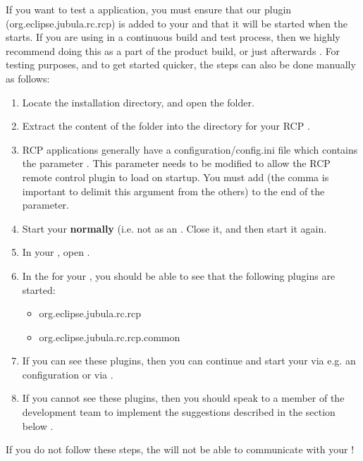 
If you want to test a  application, you must ensure that our  plugin (org.eclipse.jubula.rc.rcp) is added to your \gdaut{} and that it will be started when the \gdaut{} starts. If you are using \app{} in a continuous build and test process, then we highly recommend doing this as a part of the product build, or just afterwards . For testing purposes, and to get started quicker, the steps can also be done manually as follows:


\begin{enumerate}
\item Locate the installation directory, and open the  folder.
\item Extract the content of the  folder into the  directory for your RCP \gdaut{}.
\item RCP applications generally have a configuration/config.ini file which contains the parameter . This parameter needs to be modified to allow the RCP remote control plugin to load on \gdaut{} startup. You must add   (the comma is important to delimit this argument from the others) to the end of the  parameter.
\item Start your \gdaut{} \textbf{normally} (i.e. not as an \gdaut{}. Close it, and then start it again. 
\item In your \gdaut{}, open . 
\item In the  for your \gdaut{}, you should be able to see that the following plugins are started:
\begin{itemize}
\item org.eclipse.jubula.rc.rcp
\item org.eclipse.jubula.rc.rcp.common
\end{itemize}
\item If you can see these plugins, then you can continue and start your \gdaut{} via e.g. an \gdaut{} configuration  or via  . 
\item If you cannot see these plugins, then you should speak to a member of the development team to implement the suggestions described in the section below .
\end{enumerate}
If you do not follow these steps, the \gdagent{} will not be able to communicate with your \gdaut{}!

